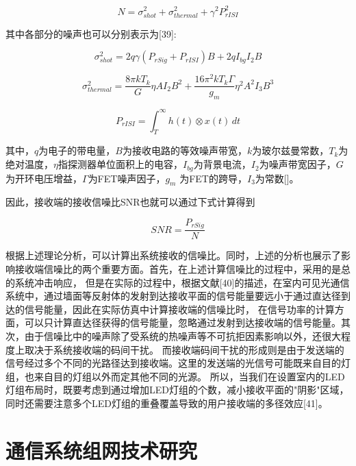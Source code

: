 \begin{equation}
    N=\sigma_{shot}^2+\sigma_{thermal}^{2}+\gamma^2P_{rISI}^2
\end{equation}

其中各部分的噪声也可以分别表示为[39]:

\begin{equation}
    \sigma_{shot}^2=2q\gamma(P_{rSig}+P_{rISI})B+2qI_{bg}I_{2}B
\end{equation}

\begin{equation}
    \sigma_{thermal}^2=\frac{8\pi kT_{k}}{G}\eta AI_{2}B^2+\frac{16\pi^2kT_{k}\Gamma}{g_{m}}\eta^2A^2I_{3}B^3
\end{equation}

\begin{equation}
    P_{rISI}=\int_{T}^{\infty}h(t) \otimes x(t)\, dt
\end{equation}

其中，$q$为电子的带电量，$B$为接收电路的等效噪声带宽，$k$为玻尔兹曼常数，$T_{k}$为绝对温度，$\eta$指探测器单位面积上的电容，$I_{bg}$为背景电流，$I_{2}$为噪声带宽因子，$G$为开环电压增益，$\Gamma$为FET噪声因子，$g_{m}$ 为FET的跨导，$I_{3}$为常数[]。

因此，接收端的接收信噪比SNR也就可以通过下式计算得到

\begin{equation}
    SNR=\frac{P_{rSig}}{N}
\end{equation}

根据上述理论分析，可以计算出系统接收的信噪比。同时，上述的分析也展示了影响接收端信噪比的两个重要方面。首先，在上述计算信噪比的过程中，采用的是总的系统冲击响应，
但是在实际的过程中，根据文献[40]的描述，在室内可见光通信系统中，通过墙面等反射体的发射到达接收平面的信号能量要远小于通过直达径到达的信号能量，因此在实际仿真中计算接收端的信噪比时，
在信号功率的计算方面，可以只计算直达径获得的信号能量，忽略通过发射到达接收端的信号能量。其次，由于信噪比中的噪声除了受系统的热噪声等不可抗拒因素影响以外，还很大程度上取决于系统接收端的码间干扰。
而接收端码间干扰的形成则是由于发送端的信号经过多个不同的光路径达到接收端。这里的发送端的光信号可能既来自目的灯组，也来自目的灯组以外而定其他不同的光源。
所以，当我们在设置室内的LED灯组布局时，既要考虑到通过增加LED灯组的个数，减小接收平面的"阴影"区域，同时还需要注意多个LED灯组的重叠覆盖导致的用户接收端的多径效应[41]。

\section{通信系统组网技术研究}\label{sec:network-tech-researh}
